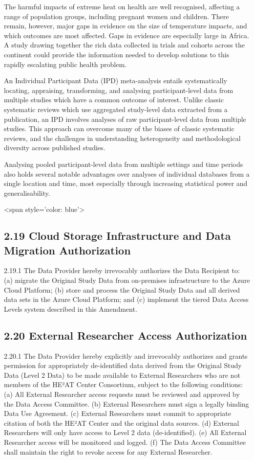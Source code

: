 \documentclass[12pt,letterpaper]{article}
\begin{document}
The harmful impacts of extreme heat on health are well recognised, affecting a range of population groups, including pregnant women and children. There remain, however, major gaps in evidence on the size of temperature impacts, and which outcomes are most affected. Gaps in evidence are especially large in Africa. A study drawing together the rich data collected in trials and cohorts across the continent could provide the information needed to develop solutions to this rapidly escalating public health problem.

An Individual Participant Data (IPD) meta-analysis entails systematically locating, appraising, transforming, and analysing participant-level data from multiple studies which have a common outcome of interest. Unlike classic systematic reviews which use aggregated study-level data extracted from a publication, an IPD involves analyses of raw participant-level data from multiple studies. This approach can overcome many of the biases of classic systematic reviews, and the challenges in understanding heterogeneity and methodological diversity across published studies.

Analysing pooled participant-level data from multiple settings and time periods also holds several notable advantages over analyses of individual databases from a single location and time, most especially through increasing statistical power and generalisability.

<span style='color: blue'>

\subsection*{2.19 Cloud Storage Infrastructure and Data Migration Authorization}

2.19.1 The Data Provider hereby irrevocably authorizes the Data Recipient to: (a) migrate the Original Study Data from on-premises infrastructure to the Azure Cloud Platform; (b) store and process the Original Study Data and all derived data sets in the Azure Cloud Platform; and (c) implement the tiered Data Access Levels system described in this Amendment.

\subsection*{2.20 External Researcher Access Authorization}

2.20.1 The Data Provider hereby explicitly and irrevocably authorizes and grants permission for appropriately de-identified data derived from the Original Study Data (Level 2 Data) to be made available to External Researchers who are not members of the HE²AT Center Consortium, subject to the following conditions: (a) All External Researcher access requests must be reviewed and approved by the Data Access Committee. (b) External Researchers must sign a legally binding Data Use Agreement. (c) External Researchers must commit to appropriate citation of both the HE²AT Center and the original data sources. (d) External Researchers will only have access to Level 2 data (de-identified). (e) All External Researcher access will be monitored and logged. (f) The Data Access Committee shall maintain the right to revoke access for any External Researcher.
\end{document}
